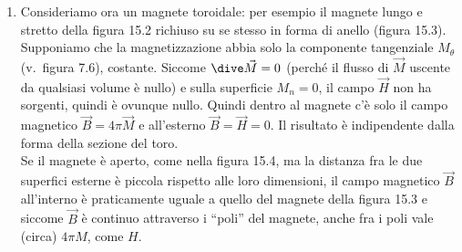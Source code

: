 \begin{enumerate}
    infinite, cio\`e
    \begin{equation}
      H_z=-4\pi\sigma_m=-4\pi M;\qquad\vec B=\vec H+4\pi\vec M=0
      \tag{15.44}
    \end{equation}
    ed in questa approssimazione (condensatore ``infinito'') all'esterno del
    magnete $\vec H$ (e quindi anche $\vec B$) \`e nullo. In alternativa, sempre
    grazie al fatto che $d\ll b$, possiamo considerare il magnete come una spira
    di raggio $b$ percorsa dalla corrente $I=cMd$, quindi il campo magnetico
    $\vec B$ dentro e fuori, ma vicino al centro del magnete, per la (7.26) \`e
    \begin{equation}
      B_z=\frac{2\pi Md}{b};\qquad H_z^{\mathrm i}=-4\pi M+\frac{2\pi Md}{b}
      \tag{15.45}
    \end{equation}
    quindi in questo caso il metodo della corrente fornisce la correzione di
    ordine $d/b$ all'approssimazione del condensatore infinito.\\
    Per entrambi i magneti il momento magnetico totale \`e
    $\vec m=\vec M\cdot V$, dove $V$ \`e il volume del magnete, quindi se i due
    magneti hanno lo stesso volume generano \underline{a grande distanza} lo
    stesso campo (campo di dipolo); ovviamente a grande distanza ($r\gg L$,
    \ $r\gg b$) le approssimazioni di solenoide infinito o di condensatore
    infinito non sono valide.

  \item Consideriamo ora un magnete toroidale: per esempio il magnete lungo e
    stretto della figura 15.2 richiuso su se stesso in forma di anello (figura
    15.3). Supponiamo che la magnetizzazione abbia solo la componente
    tangenziale $M_\theta$ (v.\ figura 7.6), costante.
    Siccome $\dive\vec M=0$ (perch\'e il flusso di $\vec M$ uscente da qualsiasi
    volume \`e nullo) e sulla superficie $M_n=0$, il campo $\vec H$ non ha
    sorgenti, quindi \`e ovunque nullo. Quindi dentro al magnete c'\`e solo il
    campo magnetico $\vec B=4\pi\vec M$ e all'esterno $\vec B=\vec H=0$. Il
    risultato \`e indipendente dalla forma della sezione del toro.\\
    Se il magnete \`e aperto, come nella figura 15.4, ma la distanza fra le due
    superfici esterne \`e piccola rispetto alle loro dimensioni, il campo
    magnetico $\vec B$ all'interno \`e praticamente uguale a quello del magnete
    della figura 15.3 e siccome $\vec B$ \`e continuo attraverso i ``poli'' del
    magnete, anche fra i poli vale (circa) $4\pi M$, come $H$.
\end{enumerate}


